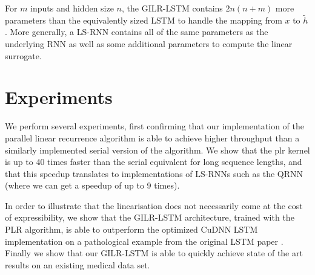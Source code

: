 \documentclass{article}
\begin{document}
For $m$ inputs and hidden size $n$, the GILR-LSTM contains $2n(n+m)$ more
parameters than the equivalently sized LSTM to handle the mapping from $x$ to
$\tilde{h}$. More generally, a LS-RNN contains all of the same parameters as the
underlying RNN as well as some additional parameters to compute the linear
surrogate.

\section{Experiments}
We perform several experiments, first confirming that our implementation of the
parallel linear recurrence algorithm is able to achieve higher throughput than a
similarly implemented serial version of the algorithm. We show that the plr kernel
is up to 40 times faster than the serial equivalent for long sequence lengths, and
that this speedup translates to implementations of LS-RNNs such as the QRNN (where
we can get a speedup of up to 9 times).

In order to illustrate that the linearisation does not necessarily come at the
cost of expressibility, we show that the GILR-LSTM architecture, trained with
the PLR algorithm, is able to outperform the optimized CuDNN LSTM implementation
on a pathological example from the original LSTM paper
\cite{hochreiter1997long}. Finally we show that our GILR-LSTM is able to
quickly achieve state of the art results on an existing medical data
set. 
\end{document}
